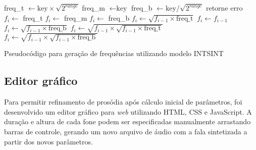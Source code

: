 \begin{algorithm}[H]
\begin{algorithmic}
\STATE freq\_t $ \gets \text{key} \times \sqrt{2^{range}}$
\STATE freq\_m $ \gets \text{key} $
\STATE freq\_b $ \gets \text{key} / \sqrt{2^{range}} $
\STATE retorne erro 
\ENDIF
{}
    \STATE $ f_i \gets $ freq\_t
    \STATE $ f_i \gets $ freq\_m
    \STATE $ f_i \gets $ freq\_b
  \STATE $ f_i \gets \sqrt{f_{i - 1} \times \text{freq\_t}} $
    \STATE $ f_i \gets f_{i - 1} $
  \STATE $ f_i \gets \sqrt{f_{i - 1} \times \text{freq\_b}} $
  \STATE $ f_i \gets \sqrt{f_{i - 1} \times  \sqrt{f_{i - 1} \times \text{freq\_t}}} $
  \STATE $ f_i \gets \sqrt{f_{i - 1} \times  \sqrt{f_{i - 1} \times \text{freq\_b}}}  $
  \ENDIF
\ENDFOR
\end{algorithmic}
\caption{Pseudocódigo para geração de frequências utilizando modelo INTSINT}
\label{alg:intsint}
\end{algorithm}


\subsection{Editor gráfico}
Para permitir refinamento de prosódia após cálculo inicial de parâmetros, foi
desenvolvido um editor gráfico para \emph{web} utilizando HTML, CSS e
JavaScript. A duração e altura de cada fone podem ser especificadas manualmente
arrastando barras de controle, gerando um novo arquivo de áudio com a fala
sintetizada a partir dos novos parâmetros.

